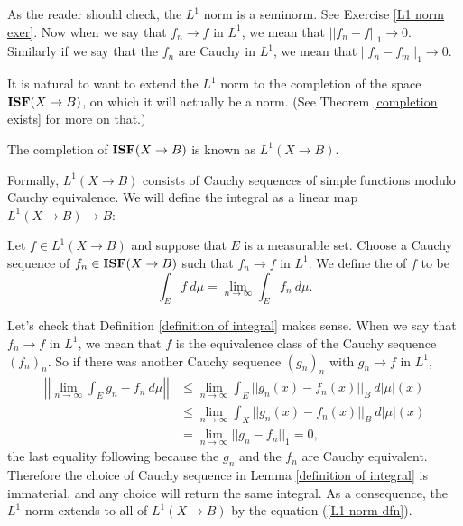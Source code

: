 \begin{subsec}
As the reader should check, the $L^1$ norm is a seminorm. See Exercise \ref{L1 norm exer}.
Now when we say that $f_{n} \to f$ in $L^1$, we mean that $||f_{n} - f||_1 \to 0$. Similarly if we say that the $f_{n}$ are Cauchy in $L^1$, we mean that $||f_{n} - f_{m}||_1 \to 0$.
\end{subsec}

\begin{subsec}
It is natural to want to extend the $L^1$ norm to the completion of the space $\mathbf{ISF}(X \to B)$, on which it will actually be a norm.
(See Theorem \ref{completion exists} for more on that.)
\end{subsec}

\begin{definition}
The completion of $\mathbf{ISF}(X \to B)$ is known as $L^1(X \to B)$.
\end{definition}

\begin{subsec}
Formally, $L^1(X \to B)$ consists of Cauchy sequences of simple functions modulo Cauchy equivalence.
We will define the integral as a linear map $L^1(X \to B) \to B$:
\end{subsec}

\begin{definition}
\label{definition of integral}
Let $f \in L^1(X \to B)$ and suppose that $E$ is a measurable set.
Choose a Cauchy sequence of $f_{n} \in \mathbf{ISF}(X \to B)$ such that $f_{n} \to f$ in $L^1$.
We define the  of $f$ to be
\[\int_{E} f~d\mu = \lim_{n \to \infty} \int_{E} f_{n}~d\mu.\]
\end{definition}

\begin{subsec}
Let's check that Definition \ref{definition of integral} makes sense. When we say that $f_{n} \to f$ in $L^1$, we mean that $f$ is the equivalence class of the Cauchy sequence $(f_{n})_{n}$.
So if there was another Cauchy sequence $(g_{n})_{n}$ with $g_{n} \to f$ in $L^1$,
\begin{align*}\left|\left|\lim_{n \to \infty} \int_{E} g_{n} - f_{n} ~d\mu\right|\right| &\leq \lim_{n \to \infty} \int_{E} ||g_{n}(x) - f_{n}(x)||_{B} ~d|\mu|(x)\\&
\leq \lim_{n \to \infty} \int_{X} ||g_{n}(x) - f_{n}(x)||_{B} ~d|\mu|(x)
\\& = \lim_{n \to \infty} ||g_{n} - f_{n}||_1 = 0,
\end{align*}
the last equality following because the $g_{n}$ and the $f_{n}$ are Cauchy equivalent.
Therefore the choice of Cauchy sequence in Lemma \ref{definition of integral} is immaterial, and any choice will return the same integral.
As a consequence, the $L^1$ norm extends to all of $L^1(X \to B)$ by the equation (\ref{L1 norm dfn}).
\end{subsec}

